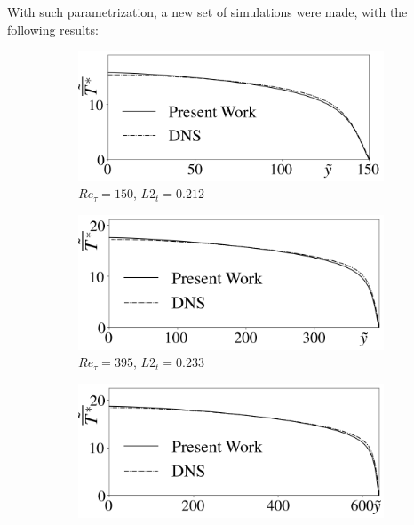 \documentclass[10pt]{article} %
\begin{document}
With such parametrization, a new set of simulations were made, with the following results:
   
   
   
\begin{figure}[!h]
	\centering
	\begin{subfigure}[t]{0.5\textwidth}
		\centering
		\includegraphics[angle=0, scale=0.24]{fotos_formatacao_final/Temperature_150_071_Prt(Ret)_Avelocity}
		\caption{$Re_\tau = 150$, $L2_t = 0.212$}
	\end{subfigure}
	\begin{subfigure}[t]{0.45\textwidth}
		\centering
		\includegraphics[angle=0, scale=0.24]{fotos_formatacao_final/Temperature_395_071_Prt(Ret)_Avelocity}
		\caption{$Re_\tau = 395$, $L2_t = 0.233$}
	\end{subfigure}
	\begin{subfigure}[t]{0.5\textwidth}
		\centering
		\includegraphics[angle=0, scale=0.24]{fotos_formatacao_final/Temperature_640_071_Prt(Ret)_Avelocity}

\end{subfigure}
\end{figure}
\end{document}
